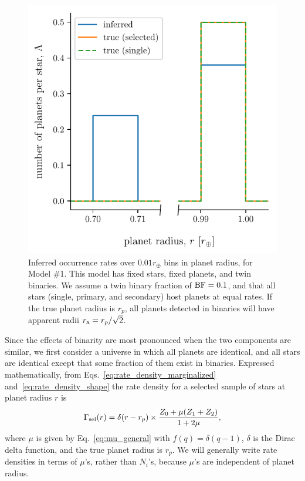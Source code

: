 \documentclass[12pt,modern]{aastex61}
\renewcommand{\a}{_{\rm a}}
\begin{document}
\begin{figure}[!tb]
    \begin{center}
        \includegraphics[width=.6\textwidth]{figures/occ_rate_vs_radius_model_1_brokenx.pdf}
    \end{center}
    \vspace{-0.5cm}
    \caption{
        Inferred occurrence rates over $0.01r_\oplus$ bins in planet 
        radius, for Model \#1.
        This model has fixed stars, fixed planets, and twin binaries. 
        We assume a twin binary fraction of ${\rm BF}=0.1$, and that all 
        stars (single, primary, and secondary) host planets at equal 
        rates.
        If the true planet radius is $r_p$, all planets detected in binaries 
        will have apparent radii $r\a = r_p/\sqrt{2}$.
    }
    \label{fig:occ_rate_model_1}
\end{figure}

Since the effects of binarity are most pronounced when the two components are 
similar, we first consider a universe in which all planets are 
identical, and all stars are identical except that some fraction of them exist 
in binaries.
Expressed mathematically, from Eqs.~\ref{eq:rate_density_marginalized} 
and~\ref{eq:rate_density_shape} the rate density for a selected sample of 
stars at planet radius $r$ is
\begin{equation}
\Gamma_{\rm sel}(r) = \delta(r-r_p) \times
\frac{
    Z_0 +
    \mu (Z_1 + Z_2)
}{1+2\mu},
\label{eq:model_1_rate_density}
\end{equation}
where $\mu$ is given by Eq.~\ref{eq:mu_general} with $f(q) = \delta(q-1)$,
$\delta$ is the Dirac delta function, and the true planet radius is 
$r_p$.
We will generally write rate densities in terms of $\mu$'s, rather than 
$N_i$'s, because $\mu$'s are independent of planet radius.
\end{document}
